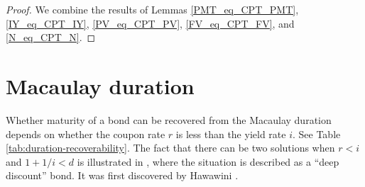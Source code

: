 \begin{proof}
	\leanok
	We combine the results of Lemmas \ref{PMT_eq_CPT_PMT}, \ref{IY_eq_CPT_IY}, \ref{PV_eq_CPT_PV}, \ref{FV_eq_CPT_FV}, and \ref{N_eq_CPT_N}.
\end{proof}


\section{Macaulay duration}

Whether maturity of a bond can be recovered from the Macaulay duration \cite{Macaulay1938Problems} depends on whether the coupon rate $r$
is less than the yield rate $i$. See Table \ref{tab:duration-recoverability}.
The fact that there can be two solutions when $r<i$ and $1+1/i<d$ is illustrated in \cite[Figure 8.3 on page 251]{ChanTse2021_finmath}, where the situation is described as a ``deep discount'' bond. It was first discovered by Hawawini \cite{Hawawini1982Duration,hawawini2017mathematics}.





